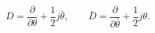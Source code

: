 \begin{equation}
  D=\frac{\partial}{\partial\theta}+\frac{1}{2}j\bar\theta,\qquad
 \bar D=\frac{\partial}{\partial\bar\theta}+\frac{1}{2}j\theta.
\label{supercov}
 \end{equation}


